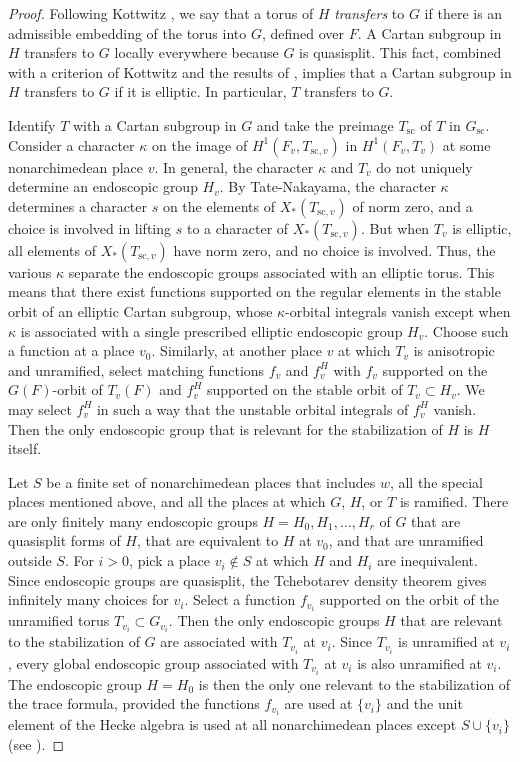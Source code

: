 \documentclass{amsart}
\newcommand\s{{\text{sc}}}
\begin{document}
\begin{proof}
Following Kottwitz \cite{Ko2}, we say that a torus 
of $H$ {\it transfers\/}
to $G$ if there is an admissible
embedding of the torus into $G$, defined over $F$.
A Cartan subgroup in $H$ transfers to $G$ locally everywhere because
$G$ is quasisplit. 
This fact, combined with a criterion of Kottwitz \cite{Ko2,9.5} and
the results of \cite{S,1.9}, implies that 
a Cartan subgroup in $H$ transfers to
$G$ if it is elliptic.  In particular, $T$ transfers to $G$.

Identify $T$ with a Cartan subgroup in $G$ and take the
preimage $T_\s$ of $T$ in $G_\s$.
Consider a character $\kappa$ on the image of $H^1(F_v,T_{\s,v})$ in
$H^1(F_v,T_v)$ at some nonarchimedean place $v$.  In general, the
character $\kappa$ and $T_v$ do not uniquely determine an
endoscopic group $H_v$.  
By Tate-Nakayama, the character $\kappa$
determines a character $s$ on the elements of
$X_*(T_{\s,v})$ of norm zero,  and a choice
is involved in lifting $s$ to a character of $X_*(T_{\s,v})$.  But
when $T_v$ is elliptic, all elements of $X_*(T_{\s,v})$
have norm zero,
and no choice is involved.  Thus, the various $\kappa$
separate the endoscopic groups associated with an elliptic torus.  This
means that there exist functions supported on the regular
elements in the stable orbit of an elliptic Cartan subgroup,
whose $\kappa$-orbital integrals vanish except when $\kappa$
is associated with a single prescribed elliptic endoscopic
group $H_v$.  Choose such a function at a place $v_0$.
Similarly, at another place $v$ at which $T_v$ is
anisotropic and unramified, select matching functions $f_v$ and $f_v^H$
with $f_v$ supported on the $G(F)$-orbit of $T_v(F)$ and $f_v^H$
supported on the stable orbit of $T_v\subset H_v$.  We may select $f_v^H$
in such a way that
the unstable orbital integrals of $f_v^H$ vanish.  Then the only
endoscopic group that is relevant for the stabilization of $H$
is $H$ itself.

Let $S$ be a finite set of nonarchimedean places that includes $w$,
all the special places mentioned above,  and
all the places at which $G$, $H$, or $T$ is ramified.  There
are only finitely many endoscopic groups $H=H_0,H_1,\ldots,H_r$
of $G$ that are
quasisplit forms of $H$, that are equivalent to $H$ at $v_0$,
 and that are unramified outside $S$.
For $i>0$, pick a place
$v_i\not\in S$ at which $H$ and $H_i$ are inequivalent.  Since
endoscopic groups are 
quasisplit, the Tchebotarev density theorem gives
infinitely many choices for $v_i$.  Select a function $f_{v_i}$
supported on the orbit of the unramified torus $T_{v_i}\subset G_{v_i}$.
Then the only endoscopic groups $H$ that are relevant to the 
stabilization of $G$ are associated with $T_{v_i}$ at $v_i$.  Since
$T_{v_i}$ is unramified at $v_i$, every global endoscopic group
associated with $T_{v_i}$ at $v_i$ is also unramified at $v_i$.
The endoscopic group $H=H_0$
is then the only one relevant to the stabilization
of the trace formula, provided the functions
$f_{v_i}$ are used at $\{v_i\}$ and the unit element of the
Hecke algebra is used at all nonarchimedean places except $S\cup \{v_i\}$
(see \cite{Ko3,7.5}).  
\bigskip


\end{proof}
\end{document}
